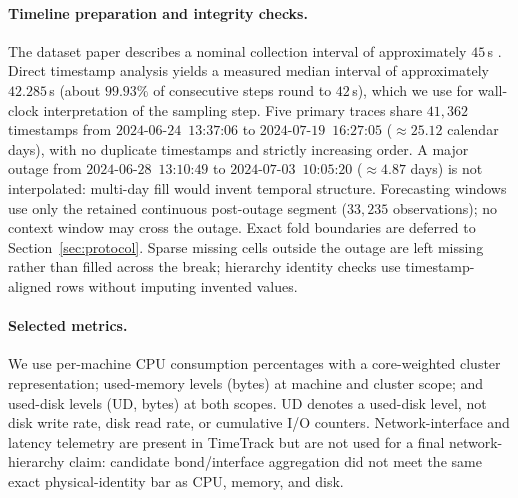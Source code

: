 \documentclass[a4paper,fleqn]{cas-dc}
\begin{document}
\paragraph{Timeline preparation and integrity checks.}
The dataset paper describes a nominal collection interval of approximately
$45$\,s \cite{meliani2025timetrack}.
Direct timestamp analysis yields a measured median interval of approximately
$42.285$\,s (about $99.93\%$ of consecutive steps round to $42$\,s), which we
use for wall-clock interpretation of the sampling step.
Five primary traces share $41{,}362$ timestamps from
$2024$-$06$-$24$~$13$:$37$:$06$ to $2024$-$07$-$19$~$16$:$27$:$05$
($\approx 25.12$ calendar days), with no duplicate timestamps and strictly
increasing order.
A major outage from $2024$-$06$-$28$~$13$:$10$:$49$ to
$2024$-$07$-$03$~$10$:$05$:$20$ ($\approx 4.87$ days) is not interpolated:
multi-day fill would invent temporal structure.
Forecasting windows use only the retained continuous post-outage segment
($33{,}235$ observations); no context window may cross the outage.
Exact fold boundaries are deferred to Section~\ref{sec:protocol}.
Sparse missing cells outside the outage are left missing rather than filled
across the break; hierarchy identity checks use timestamp-aligned rows without
imputing invented values.

\paragraph{Selected metrics.}
We use per-machine {CPU} consumption percentages with a core-weighted cluster
representation; used-memory levels (bytes) at machine and cluster scope; and
used-disk levels ({UD}, bytes) at both scopes.
{UD} denotes a used-disk level, not disk write rate, disk read rate, or
cumulative {I}/{O} counters.
Network-interface and latency telemetry are present in TimeTrack but are not
used for a final network-hierarchy claim: candidate bond/interface aggregation
did not meet the same exact physical-identity bar as {CPU}, memory, and disk.
\end{document}
